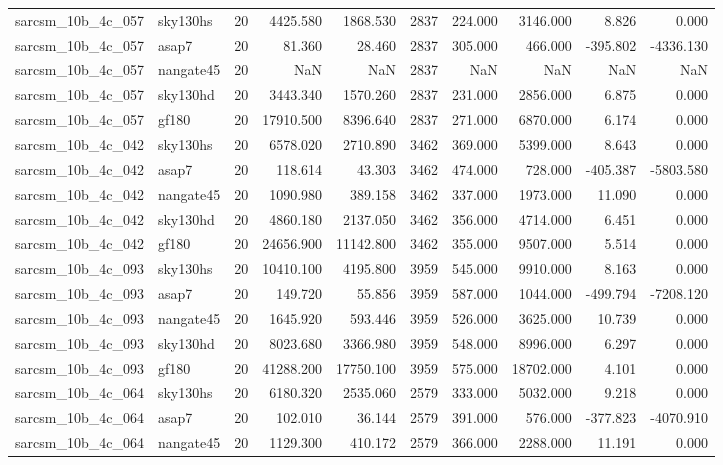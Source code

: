 \begin{tabular}{llrrrrrrrr}
sarcsm\_10b\_4c\_057 & sky130hs & 20 & 4425.580 & 1868.530 & 2837 & 224.000 & 3146.000 & 8.826 & 0.000 \\
sarcsm\_10b\_4c\_057 & asap7 & 20 & 81.360 & 28.460 & 2837 & 305.000 & 466.000 & -395.802 & -4336.130 \\
sarcsm\_10b\_4c\_057 & nangate45 & 20 & NaN & NaN & 2837 & NaN & NaN & NaN & NaN \\
sarcsm\_10b\_4c\_057 & sky130hd & 20 & 3443.340 & 1570.260 & 2837 & 231.000 & 2856.000 & 6.875 & 0.000 \\
sarcsm\_10b\_4c\_057 & gf180 & 20 & 17910.500 & 8396.640 & 2837 & 271.000 & 6870.000 & 6.174 & 0.000 \\
sarcsm\_10b\_4c\_042 & sky130hs & 20 & 6578.020 & 2710.890 & 3462 & 369.000 & 5399.000 & 8.643 & 0.000 \\
sarcsm\_10b\_4c\_042 & asap7 & 20 & 118.614 & 43.303 & 3462 & 474.000 & 728.000 & -405.387 & -5803.580 \\
sarcsm\_10b\_4c\_042 & nangate45 & 20 & 1090.980 & 389.158 & 3462 & 337.000 & 1973.000 & 11.090 & 0.000 \\
sarcsm\_10b\_4c\_042 & sky130hd & 20 & 4860.180 & 2137.050 & 3462 & 356.000 & 4714.000 & 6.451 & 0.000 \\
sarcsm\_10b\_4c\_042 & gf180 & 20 & 24656.900 & 11142.800 & 3462 & 355.000 & 9507.000 & 5.514 & 0.000 \\
sarcsm\_10b\_4c\_093 & sky130hs & 20 & 10410.100 & 4195.800 & 3959 & 545.000 & 9910.000 & 8.163 & 0.000 \\
sarcsm\_10b\_4c\_093 & asap7 & 20 & 149.720 & 55.856 & 3959 & 587.000 & 1044.000 & -499.794 & -7208.120 \\
sarcsm\_10b\_4c\_093 & nangate45 & 20 & 1645.920 & 593.446 & 3959 & 526.000 & 3625.000 & 10.739 & 0.000 \\
sarcsm\_10b\_4c\_093 & sky130hd & 20 & 8023.680 & 3366.980 & 3959 & 548.000 & 8996.000 & 6.297 & 0.000 \\
sarcsm\_10b\_4c\_093 & gf180 & 20 & 41288.200 & 17750.100 & 3959 & 575.000 & 18702.000 & 4.101 & 0.000 \\
sarcsm\_10b\_4c\_064 & sky130hs & 20 & 6180.320 & 2535.060 & 2579 & 333.000 & 5032.000 & 9.218 & 0.000 \\
sarcsm\_10b\_4c\_064 & asap7 & 20 & 102.010 & 36.144 & 2579 & 391.000 & 576.000 & -377.823 & -4070.910 \\
sarcsm\_10b\_4c\_064 & nangate45 & 20 & 1129.300 & 410.172 & 2579 & 366.000 & 2288.000 & 11.191 & 0.000 \\

\end{tabular}
